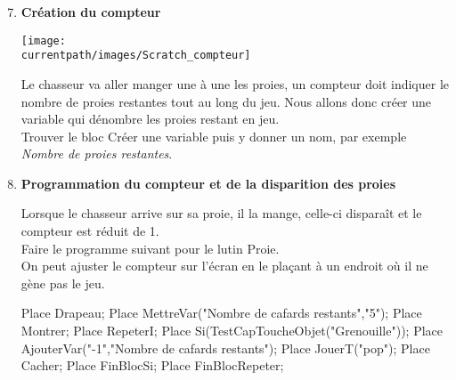 \begin{changemargin}{-10mm}{-10mm}
\begin{enigme}
      \begin{enumerate}
      \setcounter{enumi}{6}
         \item {\bf Création du compteur} \dotfill \\
            \hspace*{0.5cm}
            \begin{minipage}{0.2\linewidth}
               {\blue \texttt{[image: \\currentpath/images/Scratch\_compteur]}} \medskip
            \end{minipage}
            \qquad
            \begin{minipage}{0.55\linewidth}
               Le chasseur va aller manger une à une les proies, un compteur doit indiquer le nombre de proies restantes tout au long du jeu. Nous allons donc créer une variable qui dénombre les proies restant en jeu. \\
               Trouver le bloc \textcolor{B1}{Créer une variable} puis y donner un nom, par exemple {\it Nombre de proies restantes}.
            \end{minipage}

         \item {\bf Programmation du compteur et de la disparition des proies} \dotfill \\
            \begin{minipage}{0.55\linewidth}
               Lorsque le chasseur arrive sur sa proie, il la mange, celle-ci disparaît et le compteur est réduit de 1. \\
               Faire le programme suivant pour le lutin \textcolor{B1}{Proie}. \\
               On peut ajuster le compteur sur l'écran en le plaçant à un endroit où il ne gène pas le jeu.
            \end{minipage}
            \qquad
            \begin{minipage}{0.35\linewidth}
               \begin{Scratch}[Echelle=0.7]
                  Place Drapeau;
                  Place MettreVar("Nombre de cafards restants","5");
                  Place Montrer;
                  Place RepeterI;
                     Place Si(TestCapToucheObjet("Grenouille"));
                        Place AjouterVar("-1","Nombre de cafards restants");
                        Place JouerT("pop");
                        Place Cacher;
                     Place FinBlocSi;
                  Place FinBlocRepeter;
               \end{Scratch}
            \end{minipage}
  

\end{enumerate}
\end{enigme}
\end{changemargin}
